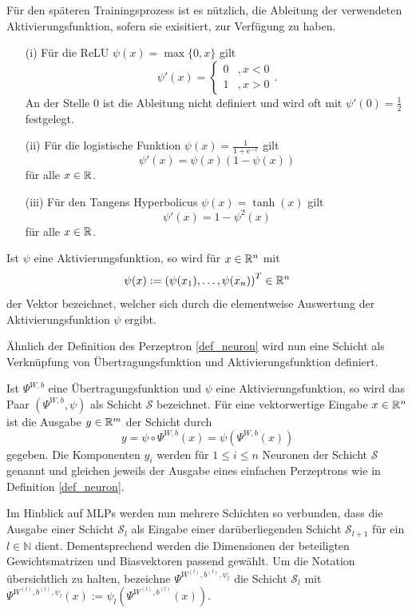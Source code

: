 Für den späteren Trainingsprozess ist es nützlich, die Ableitung der verwendeten Aktivierungsfunktion, sofern sie exisitiert, zur Verfügung zu haben.

\begin{lem}
    \begin{itemize}
        \item[(i)] Für die ReLU $\psi(x)=\max\{0,x\}$ gilt
         \[\psi'(x)=\begin{cases}
            0 &, x <0 \\
            1 &, x >0
        \end{cases}. 
        \]
        An der Stelle 0 ist die Ableitung nicht definiert und wird oft mit $\psi'(0)=\frac{1}{2}$ festgelegt.
        \item[(ii)] Für die logistische Funktion $\psi(x)=\frac{1}{1+\mathrm{e}^{-x}}$ gilt
        \[ 
            \psi'(x)=\psi(x)(1-\psi(x)) 
        \]
        für alle $x \in \mathbb{R}$.
        \item[(iii)] Für den Tangens Hyperbolicus $\psi(x)=\tanh(x)$ gilt
        \[ 
            \psi'(x)=1-\psi^2(x) 
        \]
        für alle $x \in \mathbb{R}$.
    \end{itemize}
\end{lem}

\begin{bem}
    Ist $\psi$ eine Aktivierungsfunktion, so wird für $x \in \mathbb{R}^n$ mit 
    \[\psi(x):=\left(\psi(x_1), \ldots, \psi(x_n)\right)^T \in \mathbb{R}^n
    \]
    der Vektor bezeichnet, welcher sich durch die elementweise Auswertung der Aktivierungsfunktion $\psi$ ergibt. 
\end{bem}

Ähnlich der Definition des Perzeptron \ref{def_neuron} wird nun eine Schicht als Verknüpfung von Übertragungsfunktion und Aktivierungsfunktion definiert.

\begin{defi}[Schicht]
    Ist $\Psi^{W,b}$ eine Übertragungsfunktion und $\psi$ eine Aktivierungsfunktion, so wird das Paar $(\Psi^{W,b}, \psi)$ als Schicht $\mathcal{S}$ bezeichnet. Für eine vektorwertige Eingabe $x \in \mathbb{R}^n$ ist die Ausgabe $y \in \mathbb{R}^m$ der Schicht durch
    \[y=\psi \circ \Psi^{W,b}(x)= \psi\left(\Psi^{W,b}(x)\right)
        \] 
        gegeben. Die Komponenten $y_i$ werden für $1 \leq i \leq n$ Neuronen der Schicht $\mathcal{S}$ genannt und gleichen jeweils der Ausgabe eines einfachen Perzeptrons wie in Definition \ref{def_neuron}. 
\end{defi}
Im Hinblick auf MLPs werden nun mehrere Schichten so verbunden, dass die Ausgabe einer Schicht $\mathcal{S}_l$ als Eingabe einer darüberliegenden Schicht $\mathcal{S}_{l+1}$ für ein $l \in \mathbb{N}$ dient. Dementsprechend werden die Dimensionen der beteiligten Gewichtsmatrizen und Biasvektoren passend gewählt. 
Um die Notation übersichtlich zu halten, bezeichne $\Psi^{W^{(l)},b^{(l)},\psi_{l}}$ die Schicht $\mathcal{S}_l$ mit $\Psi^{W^{(l)},b^{(l)},\psi_{l}}(x):= \psi_{l} \left(\Psi^{W^{(l)},b^{(l)}}(x)\right)$.

